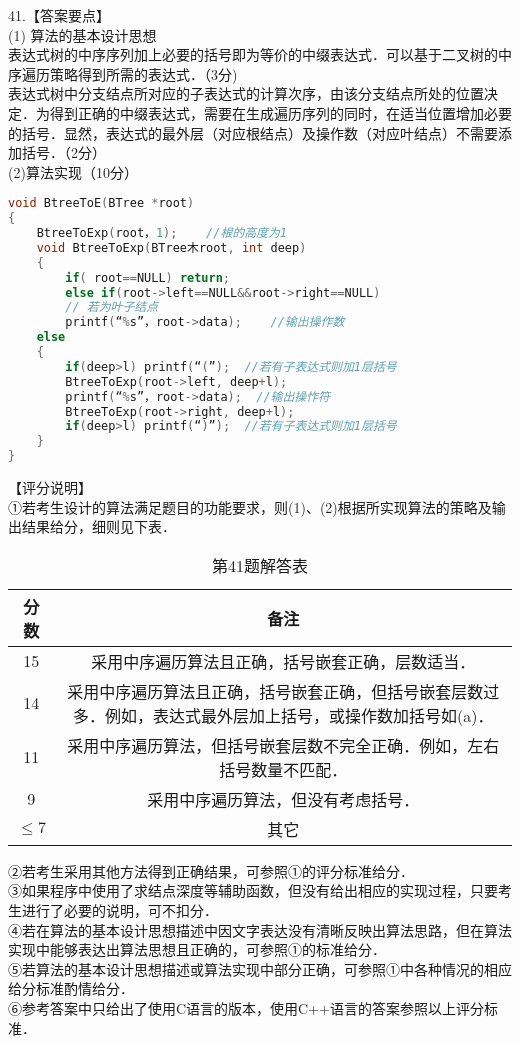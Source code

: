 41.【答案要点】 \\
(1) 算法的基本设计思想 \\
表达式树的中序序列加上必要的括号即为等价的中缀表达式．可以基于二叉树的中序遍历策略得到所需的表达式．（3分) \\
表达式树中分支结点所对应的子表达式的计算次序，由该分支结点所处的位置决定．为得到正确的中缀表达式，需要在生成遍历序列的同时，在适当位置增加必要的括号．显然，表达式的最外层（对应根结点）及操作数（对应叶结点）不需要添加括号．（2分） \\
(2)算法实现（10分） \\
\begin{lstlisting}[language=cpp]
void BtreeToE(BTree *root)
{
    BtreeToExp(root，1);    //根的高度为1
    void BtreeToExp(BTree木root, int deep)
    {
        if( root==NULL) return;
        else if(root->left==NULL&&root->right==NULL)
        // 若为叶子结点
        printf(“%s”，root->data);    //输出操作数
    else
    {
        if(deep>l) printf(“(”);  //若有子表达式则加1层括号
        BtreeToExp(root->left, deep+l);
        printf(“%s”，root->data);  //输出操怍符
        BtreeToExp(root->right, deep+l);
        if(deep>l) printf(“)”);  //若有子表达式则加1层括号
    }
}
\end{lstlisting}
【评分说明】 \\
①若考生设计的算法满足题目的功能要求，则(1)、(2)根据所实现算法的策略及输出结果给分，细则见下表．
\begin{table}[ht]
\centering
\caption{第41题解答表}\label{CSN17_tab3}
\begin{tabular}{|c|c|}
\hline
分数 & 备注 \\
\hline
15 & 采用中序遍历算法且正确，括号嵌套正确，层数适当． \\
\hline
14 & 采用中序遍历算法且正确，括号嵌套正确，但括号嵌套层数过多．例如，表达式最外层加上括号，或操作数加括号如(a)． \\
\hline
11 & 采用中序遍历算法，但括号嵌套层数不完全正确．例如，左右括号数量不匹配． \\
\hline
9 & 采用中序遍历算法，但没有考虑括号． \\
\hline
$\leqslant7$ & 其它 \\
\hline
\end{tabular}
\end{table}
②若考生采用其他方法得到正确结果，可参照①的评分标准给分． \\
③如果程序中使用了求结点深度等辅助函数，但没有给出相应的实现过程，只要考生进行了必要的说明，可不扣分． \\
④若在算法的基本设计思想描述中因文字表达没有清晰反映出算法思路，但在算法实现中能够表达出算法思想且正确的，可参照①的标准给分． \\
⑤若算法的基本设计思想描述或算法实现中部分正确，可参照①中各种情况的相应给分标准酌情给分． \\
⑥参考答案中只给出了使用C语言的版本，使用C++语言的答案参照以上评分标准．

